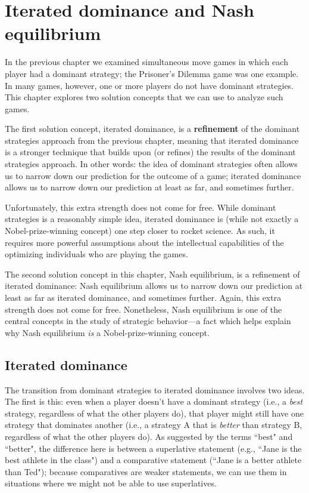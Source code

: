 \chapter{Iterated dominance and Nash equilibrium}
\label{2nash}

In the previous chapter we examined simultaneous move games in which each player had a dominant strategy; the Prisoner's Dilemma game was one example. In many games, however, one or more players do not have dominant strategies. This chapter explores two solution concepts that we can use to analyze such games.

The first solution concept, iterated dominance, is a \textbf{refinement} of the dominant strategies approach from the previous chapter, meaning that iterated dominance is a stronger technique that builds upon (or refines) the results of the dominant strategies approach. In other words: the idea of dominant strategies often allows us to narrow down our prediction for the outcome of a game; iterated dominance allows us to narrow down our prediction at least as far, and sometimes further.

Unfortunately, this extra strength does not come for free. While dominant strategies is a reasonably simple idea, iterated dominance is (while not exactly a Nobel-prize-winning concept) one step closer to rocket science. As such, it requires more powerful assumptions about the intellectual capabilities of the optimizing individuals who are playing the games.

The second solution concept in this chapter, Nash equilibrium, is a refinement of iterated dominance: Nash equilibrium allows us to narrow down our prediction at least as far as iterated dominance, and sometimes further. Again, this extra strength does not come for free. Nonetheless, Nash equilibrium is one of the central concepts in the study of strategic behavior---a fact which helps explain why Nash equilibrium \emph{is} a Nobel-prize-winning concept.




\section{Iterated dominance}

The transition from dominant strategies to iterated dominance involves two ideas. The first is this: even when a player doesn't have a dominant strategy (i.e., a \emph{best} strategy, regardless of what the other players do), that player might still have one strategy that dominates another (i.e., a strategy A that is \emph{better} than strategy B, regardless of what the other players do). As suggested by the terms ``best" and ``better", the difference here is between a superlative statement (e.g., ``Jane is the best athlete in the class") and a comparative statement (``Jane is a better athlete than Ted"); because comparatives are weaker statements, we can use them in situations where we might not be able to use superlatives.

